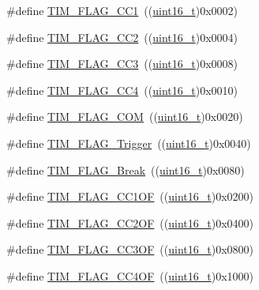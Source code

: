 \begin{DoxyCompactItemize}
\item 
\#define \hyperlink{group___t_i_m___flags_gaa7eb8be054b9bd217a9abb1c8687cc55}{T\+I\+M\+\_\+\+F\+L\+A\+G\+\_\+\+C\+C1}~((\hyperlink{_p_e___types_8h_a1f1825b69244eb3ad2c7165ddc99c956}{uint16\+\_\+t})0x0002)
\item 
\#define \hyperlink{group___t_i_m___flags_ga9cae242f1c51b31839ffc5bc007c82a7}{T\+I\+M\+\_\+\+F\+L\+A\+G\+\_\+\+C\+C2}~((\hyperlink{_p_e___types_8h_a1f1825b69244eb3ad2c7165ddc99c956}{uint16\+\_\+t})0x0004)
\item 
\#define \hyperlink{group___t_i_m___flags_ga052c380f922219659810e4fceb574a7c}{T\+I\+M\+\_\+\+F\+L\+A\+G\+\_\+\+C\+C3}~((\hyperlink{_p_e___types_8h_a1f1825b69244eb3ad2c7165ddc99c956}{uint16\+\_\+t})0x0008)
\item 
\#define \hyperlink{group___t_i_m___flags_gafd0dc57b56941f8b8250d66e289542db}{T\+I\+M\+\_\+\+F\+L\+A\+G\+\_\+\+C\+C4}~((\hyperlink{_p_e___types_8h_a1f1825b69244eb3ad2c7165ddc99c956}{uint16\+\_\+t})0x0010)
\item 
\#define \hyperlink{group___t_i_m___flags_gad454d70205ce5bbf3b3c0e7e43d6df62}{T\+I\+M\+\_\+\+F\+L\+A\+G\+\_\+\+C\+OM}~((\hyperlink{_p_e___types_8h_a1f1825b69244eb3ad2c7165ddc99c956}{uint16\+\_\+t})0x0020)
\item 
\#define \hyperlink{group___t_i_m___flags_gaeca2f17eea738dbec7eee8ecbe442814}{T\+I\+M\+\_\+\+F\+L\+A\+G\+\_\+\+Trigger}~((\hyperlink{_p_e___types_8h_a1f1825b69244eb3ad2c7165ddc99c956}{uint16\+\_\+t})0x0040)
\item 
\#define \hyperlink{group___t_i_m___flags_ga166571a1d5ca2bfca5d923eaa22f6deb}{T\+I\+M\+\_\+\+F\+L\+A\+G\+\_\+\+Break}~((\hyperlink{_p_e___types_8h_a1f1825b69244eb3ad2c7165ddc99c956}{uint16\+\_\+t})0x0080)
\item 
\#define \hyperlink{group___t_i_m___flags_ga38dfb7d1ed00af77d70bc3be28500108}{T\+I\+M\+\_\+\+F\+L\+A\+G\+\_\+\+C\+C1\+OF}~((\hyperlink{_p_e___types_8h_a1f1825b69244eb3ad2c7165ddc99c956}{uint16\+\_\+t})0x0200)
\item 
\#define \hyperlink{group___t_i_m___flags_ga4df0c71d3e695c214d49802942e04590}{T\+I\+M\+\_\+\+F\+L\+A\+G\+\_\+\+C\+C2\+OF}~((\hyperlink{_p_e___types_8h_a1f1825b69244eb3ad2c7165ddc99c956}{uint16\+\_\+t})0x0400)
\item 
\#define \hyperlink{group___t_i_m___flags_gac81f24eaffdf83c2db9d2e6078a00919}{T\+I\+M\+\_\+\+F\+L\+A\+G\+\_\+\+C\+C3\+OF}~((\hyperlink{_p_e___types_8h_a1f1825b69244eb3ad2c7165ddc99c956}{uint16\+\_\+t})0x0800)
\item 
\#define \hyperlink{group___t_i_m___flags_gafc8b04654766d98ba2c6fed601895a20}{T\+I\+M\+\_\+\+F\+L\+A\+G\+\_\+\+C\+C4\+OF}~((\hyperlink{_p_e___types_8h_a1f1825b69244eb3ad2c7165ddc99c956}{uint16\+\_\+t})0x1000)

\end{DoxyCompactItemize}
